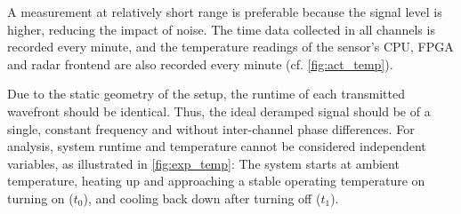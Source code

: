 A measurement at relatively short range is preferable because the signal level is higher, 
reducing the impact of noise. The time data collected in all channels is recorded every minute, 
and the temperature readings of the sensor's CPU, FPGA and radar frontend 
are also recorded every minute (cf. \ref{fig:act_temp}).

Due to the static geometry of the setup, the runtime of each transmitted wavefront should be identical.
Thus, the ideal deramped signal should be of a single, constant frequency and without inter-channel phase differences.
For analysis, system runtime and temperature cannot be considered independent variables, as illustrated in \autoref{fig:exp_temp}:
The system starts at ambient temperature, heating up and approaching a stable operating temperature on turning on ($t_0$), and cooling back down after turning off ($t_1$).

